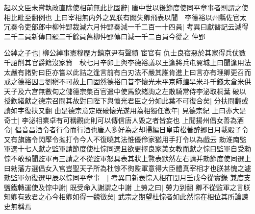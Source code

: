 起以文臣未嘗執政直除使相前無此比固辭|{
	唐中世以後節度使同平章事者則謂之使相比毗至翻例也}
上曰宰相無内外之異朕有闕失卿飛表以聞　李德裕以州縣佐官太冗奏令吏部郎中柳仲郢裁減六月仲郢奏減一千二百一十四員|{
	考異曰獻替記云減得二千二員新傳曰罷二千餘員舊柳仲郢傳曰減一千二百員今從之}
仲郢

公綽之子也|{
	柳公綽事憲穆歷方鎮京尹有聲績}
宦官有仇士良宿惡於其家得兵仗數千詔削其官爵籍沒家貲　秋七月辛卯上與李德裕議以王逢將兵屯翼城上曰聞逢用法太嚴有諸對曰臣亦嘗以此詰之逢言前有白刃法不嚴其誰肯進上曰言亦有理卿更召而戒之德裕因言劉稹不可赦上曰固然德裕曰昔李懷光未平京師蝗旱米斗千錢太倉米供天子及六宫無數旬之儲德宗集百官遣中使馬欽緒詢之左散騎常侍李泌取桐葉破以授欽緒獻之德宗召問其故對曰陛下與懷光君臣之分如此葉不可復合矣|{
	分扶問翻或讀如字復扶又翻}
由是德宗意定既破懷光遂用為相獨任數年|{
	見德宗紀}
上曰亦大是奇士|{
	李泌相業卓有可稱觀此則可以傳信唐人毁之者皆妄也}
上聞揚州倡女善為酒令|{
	倡音昌酒令者行令而行酒也唐人多好為之却掃編日皇甫松著醉郷日月載骰子令又有旗旛令閃擪令抛打令今人不復曉其法惟優伶家猶用手打令以為戲云}
勑淮南監軍選十七人獻之監軍請節度使杜悰同選且欲更擇良家美女教而獻之悰曰監軍自受勑悰不敢預聞監軍再三請之不從監軍怒具表其狀上覽表默然左右請并勑節度使同選上曰勑藩方選倡女入宫豈聖天子所為杜悰不徇監軍意得大臣體真宰相才也朕甚愧之遽勑監軍勿復選甲辰以悰同平章事　|{
	考異曰新表悰入相在閏月壬戌今從實錄}
兼度支鹽鐵轉運使及悰中謝|{
	既受命入謝謂之中謝}
上勞之曰|{
	勞力到翻}
卿不從監軍之言朕知卿有致君之心今相卿如得一魏徵矣|{
	武宗之期望杜悰者如此然悰在相位其所論諫史無稱焉}


